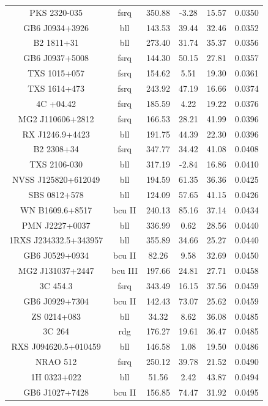 \begin{center}
\begin{longtable}{||cccccc||}
PKS 2320-035 &  fsrq  & 350.88 & -3.28 & 15.57 & 0.0350  \\
GB6 J0934+3926 &  bll  & 143.53 & 39.44 & 32.46 & 0.0352  \\
B2 1811+31 &  bll  & 273.40 & 31.74 & 35.37 & 0.0356  \\
GB6 J0937+5008 &  fsrq  & 144.30 & 50.15 & 27.81 & 0.0357  \\
TXS 1015+057 &  fsrq  & 154.62 & 5.51 & 19.30 & 0.0361  \\
TXS 1614+473 &  fsrq  & 243.92 & 47.19 & 16.66 & 0.0374  \\
4C +04.42 &  fsrq  & 185.59 & 4.22 & 19.22 & 0.0376  \\
MG2 J110606+2812 &  fsrq  & 166.53 & 28.21 & 41.99 & 0.0396  \\
RX J1246.9+4423 &  bll  & 191.75 & 44.39 & 22.30 & 0.0396  \\
B2 2308+34 &  fsrq  & 347.77 & 34.42 & 41.08 & 0.0408  \\
TXS 2106-030 &  bll  & 317.19 & -2.84 & 16.86 & 0.0410  \\
NVSS J125820+612049 &  bll  & 194.59 & 61.35 & 36.36 & 0.0425  \\
SBS 0812+578 &  bll  & 124.09 & 57.65 & 41.15 & 0.0426  \\
WN B1609.6+8517 &  bcu II  & 240.13 & 85.16 & 37.14 & 0.0434  \\
PMN J2227+0037 &  bll  & 336.99 & 0.62 & 28.56 & 0.0440  \\
1RXS J234332.5+343957 &  bll  & 355.89 & 34.66 & 25.27 & 0.0440  \\
GB6 J0529+0934 &  bcu II  & 82.26 & 9.58 & 32.69 & 0.0450  \\
MG2 J131037+2447 &  bcu III  & 197.66 & 24.81 & 27.71 & 0.0458  \\
3C 454.3 &  fsrq  & 343.49 & 16.15 & 37.56 & 0.0459  \\
GB6 J0929+7304 &  bcu II  & 142.43 & 73.07 & 25.62 & 0.0459  \\
ZS 0214+083 &  bll  & 34.32 & 8.62 & 36.08 & 0.0485  \\
3C 264 &  rdg  & 176.27 & 19.61 & 36.47 & 0.0485  \\
RXS J094620.5+010459 &  bll  & 146.58 & 1.08 & 19.50 & 0.0486  \\
NRAO 512 &  fsrq  & 250.12 & 39.78 & 21.52 & 0.0490  \\
1H 0323+022 &  bll  & 51.56 & 2.42 & 43.87 & 0.0494  \\
GB6 J1027+7428 &  bcu II  & 156.85 & 74.47 & 31.92 & 0.0495  \\

\end{longtable}
\end{center}
